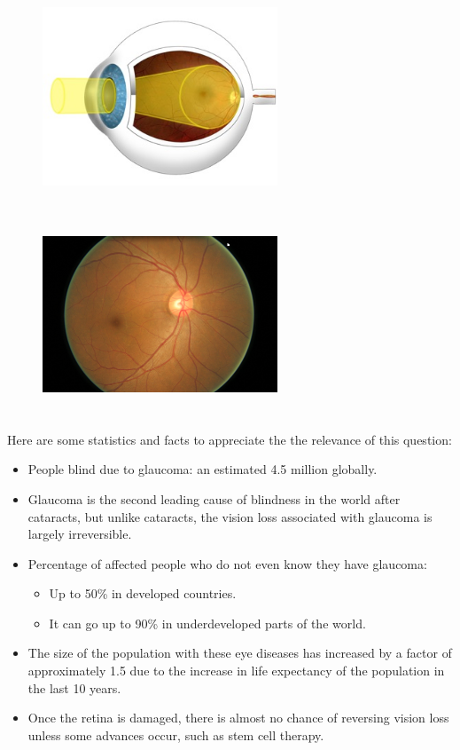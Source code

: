 \documentclass[11pt, a4paper]{article}
\begin{document}
\begin{figure}[H]
\centering
\begin{minipage}{.5\textwidth}
  \centering
  \includegraphics[width=7cm, height=6cm]{imgs/general/Retinal_fundus_image_obtention.jpg}
  \label{fig:Retinal_fundus_image_obtention}
\end{minipage}%
\begin{minipage}{.5\textwidth}
  \centering
  \includegraphics[width=7cm, height=6cm]{imgs/general/Retinal_fundus_image.jpg}
  \label{fig:Retinal_fundus_image}
\end{minipage}
\end{figure}
\noindent Here are some statistics and facts to appreciate the the relevance of this question:
\begin{itemize}
    \item People blind due to glaucoma: an estimated 4.5 million globally.
    \item Glaucoma is the second leading cause of blindness in the world after cataracts, but unlike cataracts, the vision loss associated with glaucoma is largely irreversible.
    \item Percentage of affected people who do not even know they have glaucoma: 
     \begin{itemize}
      \item Up to 50\% in developed countries.
      \item  It can go up to 90\% in underdeveloped parts of the world.
    \end{itemize}
    \item The size of the population with these eye diseases has increased by a factor of approximately 1.5 due to the increase in life expectancy of the population in the last 10 years.
    \item Once the retina is damaged, there is almost no chance of reversing vision loss unless some advances occur, such as stem cell therapy.
\end{itemize}
\end{document}
